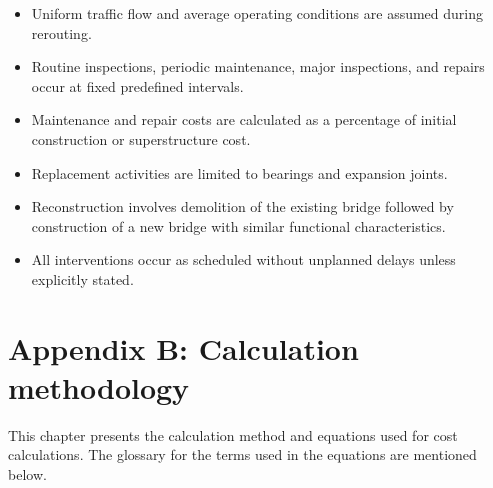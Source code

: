 \documentclass[12pt,a4paper]{article}
\begin{document}
\begin{itemize}
\item Uniform traffic flow and average operating conditions are assumed during rerouting.
\item Routine inspections, periodic maintenance, major inspections, and repairs occur at fixed predefined intervals.
\item Maintenance and repair costs are calculated as a percentage of initial construction or superstructure cost.
\item Replacement activities are limited to bearings and expansion joints.
\item Reconstruction involves demolition of the existing bridge followed by construction of a new bridge with similar functional characteristics.
\item All interventions occur as scheduled without unplanned delays unless explicitly stated.
\end{itemize}


\clearpage






\clearpage
\setcounter{section}{2}
\setcounter{table}{0}
\setcounter{figure}{0}
\renewcommand{\thetable}{B-\arabic{table}}
\renewcommand{\thefigure}{B-\arabic{figure}}


\newpage
\section*{Appendix B: Calculation methodology}

\noindent
This chapter presents the calculation method and equations used for cost calculations.
The glossary for the terms used in the equations are mentioned below.

\vspace{0.5em}
\end{document}
